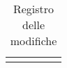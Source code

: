 \begin{center}
\begin{longtable}{  >{\RaggedRight}p{.8cm}  
						>{\RaggedRight}p{1.8cm} 
						>{\RaggedRight}p{1.8cm} 
						>{\RaggedRight}p{2.5cm} 
						>{\RaggedRight}p{6cm} 
						}
		\rowcolor{white}
		\caption{Registro delle modifiche}\\
\end{longtable}
\label{tab:changelog}
\end{center}

